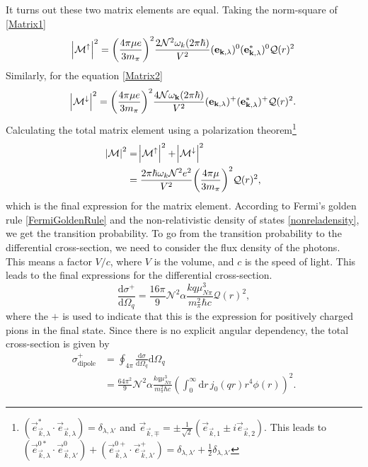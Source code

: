 It turns out these two matrix elements are equal. Taking the norm-square of \eqref{Matrix1}
\begin{equation}
	\abs{\mathcal{M}^\uparrow}^2 = \bigg( \frac{4\pi \mu e}{3m_\pi}\bigg)^2 \frac{2 \mathcal{N}^2\omega_k (2\pi \hbar)}{V^2}(\bm{\mathrm{e}}_{\bm{\mathrm{k}},\lambda})^0(\bm{\mathrm{e}}_{\bm{\mathrm{k}},\lambda}^*)^0 \mathcal{Q}(r)^2 
\end{equation}
Similarly, for the equation \eqref{Matrix2}
\begin{equation}
	\abs{\mathcal{M}^\downarrow}^2 = \bigg( \frac{4\pi \mu e}{3 m_\pi}\bigg)^2 \frac{4\mathcal{N}\omega_{\bm{\mathrm{k}}}(2\pi\hbar)}{V^2}(\bm{\mathrm{e}}_{\bm{\mathrm{k}},\lambda})^+(\bm{\mathrm{e}}_{\bm{\mathrm{k}},\lambda}^*)^+ \mathcal{Q}(r)^2.
\end{equation}
Calculating the total matrix element using a polarization theorem\footnote{$(\vec{e}_{\vec{k},\lambda}^*\cdot \vec{e}_{\vec{k},\lambda})=\delta_{\lambda,\lambda'}$ and $\vec{e}_{\vec{k},\mp}=\pm\frac{1}{\sqrt{2}}(\vec{e}_{\vec{k},1}\pm i\vec{e}_{\vec{k},2})$. This leads to $(\vec{e}^{0*}_{\vec{k},\lambda}\cdot\vec{e}^{0}_{\vec{k},\lambda'})+(\vec{e}^{0+}_{\vec{k},\lambda}\cdot\vec{e}^{+}_{\vec{k},\lambda'})=\delta_{\lambda,\lambda'}+\frac{1}{2}\delta_{\lambda,\lambda'}$}
\begin{align}
	\abs{\mathcal{M}}^2 &= \abs{\mathcal{M}^\uparrow}^2 + \abs{\mathcal{M}^\downarrow}^2 \\
	&= \frac{2\pi \hbar \omega_k \mathcal{N}^2 e^2}{V^2} \bigg( \frac{4\pi\mu}{3m_\pi}\bigg)^2 \mathcal{Q}(r)^2,
\end{align}
which is the final expression for the matrix element. According to Fermi's golden rule \eqref{FermiGoldenRule} and the non-relativistic density of states \eqref{nonreladensity}, we get the transition probability.
To go from the transition probability to the differential cross-section, we need to consider the flux density of the photons. This means a factor $V/c$, where $V$ is the volume, and $c$ is the speed of light. This leads to the final expressions for the differential cross-section.
\begin{equation}\label{diffcrosssection}
	\frac{\text{d}\sigma^+}{\text{d}\Omega_q}=\frac{16 \pi}{9} \mathcal{N}^2 \alpha\frac{kq\mu^3_{N\pi}}{m_\pi^2 \hbar c}\mathcal{Q}(r)^2,
\end{equation}
where the $+$ is used to indicate that this is the expression for positively charged pions in the final state. Since there is no explicit angular dependency, the total cross-section is given by
\begin{align} 
	\sigma_\text{dipole}^+ & = \oint_{4\pi} \frac{\text{d}\sigma}{\text{d}\Omega_q} \text{d}\Omega_q \\
	&= \frac{64\pi^2}{9}\mathcal{N}^2 \alpha \frac{kq\mu^3_{N\pi}}{m_\pi^2 \hbar c} \left( \int_0^\infty \text{d}r \, j_0(qr)r^4 \phi(r)\right)^2 \label{dipoletotalcross}.
\end{align}
